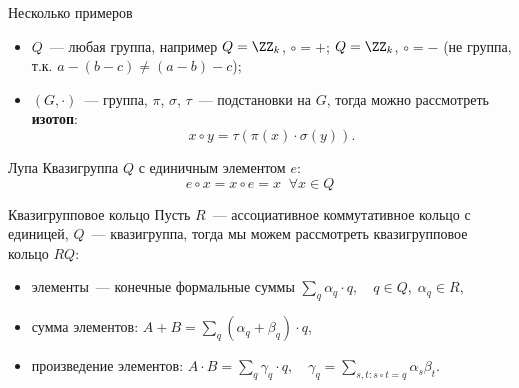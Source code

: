 \begin{frame}{Несколько примеров}
    \begin{itemize}
        \item $Q$~--- любая группа, например $Q = \ZZ_k$, $\circ = +$; $Q = \ZZ_k$, $\circ = -$ (не группа, т.к. $a - (b - c) \ne (a - b) - c$);
        \pause
        \item $(G, \cdot)$~--- группа, $\pi$, $\sigma$, $\tau$~--- подстановки на $G$, тогда можно рассмотреть \textbf{изотоп}:
        \[
            x \circ y = \tau(\pi(x) \cdot \sigma(y)).
        \]
    \end{itemize}
    \pause 
    \begin{block}{Лупа}
        Квазигруппа $Q$ с единичным элементом $e$: 
        \[
            e \circ x = x \circ e = x \; \; \forall x \in Q
        \]
    \end{block}
    \pause 
    \begin{block}{Квазигрупповое кольцо}
        Пусть $R$~--- ассоциативное коммутативное кольцо с единицей, $Q$~--- квазигруппа, тогда мы можем рассмотреть квазигрупповое кольцо $RQ$:
        \begin{itemize}
            \item элементы~--- конечные формальные суммы $\sum_q \alpha_q \cdot q, \quad q \in Q, \; \alpha_q \in R$,
            \item сумма элементов: $A + B = \sum_q (\alpha_q + \beta_q) \cdot q$,
            \item произведение элементов: $A \cdot B = \sum_q \gamma_q \cdot q, \quad \gamma_q = \sum_{s,t: s \circ t = q} \alpha_s \beta_t$.
        \end{itemize}
     \end{block}
\end{frame}


